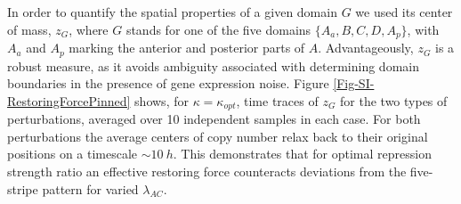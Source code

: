 \documentclass[10pt]{article}
\newcommand{\GA}{A\xspace}
\newcommand{\GB}{B\xspace}
\newcommand{\GC}{C\xspace}
\newcommand{\GD}{D\xspace}
\begin{document}
In order to quantify the spatial properties of a given domain $G$ we used its center of mass, $z_G$, where $G$ stands for one of the five domains $\{ \GA_a, \GB, \GC, \GD, \GA_p \}$, with $\GA_a$ and $\GA_p$ marking the anterior and posterior parts of $\GA$. Advantageously, $z_G$ is a robust measure, as it avoids ambiguity associated with determining domain boundaries in the presence of gene expression noise.
Figure \ref{Fig-SI-RestoringForcePinned} shows, for $\kappa=\kappa_{opt}$,
time traces of $z_G$ for the two types of perturbations, averaged over 10 independent samples in each case. For both perturbations the average centers of copy number relax back to their original positions on a timescale $\sim 10~h$. This demonstrates that for optimal repression strength ratio an effective restoring force counteracts deviations from the five-stripe pattern for varied $\lambda_{AC}$.
\end{document}

